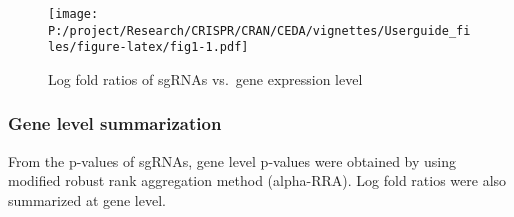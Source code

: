 \documentclass[
]{article}
\newenvironment{Shaded}{\begin{snugshade}}{\end{snugshade}}
\newcommand{\AttributeTok}[1]{\textcolor[rgb]{0.77,0.63,0.00}{#1}}
\newcommand{\DecValTok}[1]{\textcolor[rgb]{0.00,0.00,0.81}{#1}}
\newcommand{\FloatTok}[1]{\textcolor[rgb]{0.00,0.00,0.81}{#1}}
\newcommand{\FunctionTok}[1]{\textcolor[rgb]{0.00,0.00,0.00}{#1}}
\newcommand{\NormalTok}[1]{#1}
\newcommand{\OtherTok}[1]{\textcolor[rgb]{0.56,0.35,0.01}{#1}}
\newcommand{\SpecialCharTok}[1]{\textcolor[rgb]{0.00,0.00,0.00}{#1}}
\newcommand{\StringTok}[1]{\textcolor[rgb]{0.31,0.60,0.02}{#1}}
\begin{document}
\begin{figure}
\centering
\texttt{[image: P:/project/Research/CRISPR/CRAN/CEDA/vignettes/Userguide\_files/figure-latex/fig1-1.pdf]}
\caption{Log fold ratios of sgRNAs vs.~gene expression level}
\end{figure}

\hypertarget{gene-level-summarization}{%
\subsubsection{Gene level
summarization}\label{gene-level-summarization}}

From the p-values of sgRNAs, gene level p-values were obtained by using
modified robust rank aggregation method (alpha-RRA). Log fold ratios
were also summarized at gene level.

\begin{Shaded}
\end{Shaded}
\end{document}
